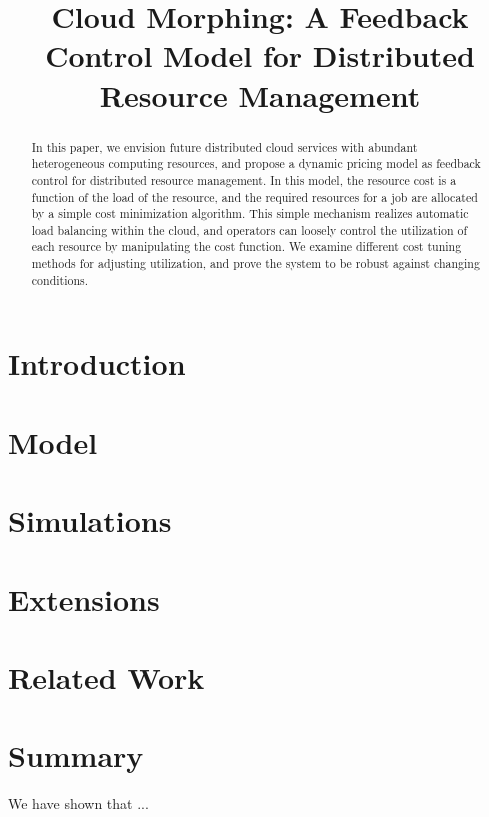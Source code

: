 \documentclass[10pt,sigconf,letterpaper,anonymous,nonacm]{acmart}
\title{Cloud Morphing: A Feedback Control Model for Distributed Resource Management}
\begin{document}
\begin{abstract}

    In this paper, we envision future distributed cloud services with
    abundant heterogeneous computing resources,
    and propose a dynamic pricing model as feedback control for
    distributed resource management.
    In this model, the resource cost is a function of the load of the
    resource, and the required resources for a job are allocated by a
    simple cost minimization algorithm.  This simple mechanism realizes
    automatic load balancing within the cloud, and operators can loosely
    control the utilization of each resource by manipulating the cost function.
    We examine different cost tuning methods for adjusting utilization, and
    prove the system to be robust against changing conditions.

\end{abstract}

\maketitle

\section{Introduction}



\section{Model}



\section{Simulations}



\section{Extensions}



\section{Related Work}



\section{Summary}

We have shown that ...



\end{document}
